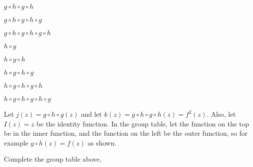 \documentclass[../gatm_answers.tex]{subfiles}
\begin{document}
\begin{inner_problem}
\item $g\circ h\circ g\circ h$
\end{inner_problem}

\begin{inner_problem}
\item $g\circ h\circ g\circ h\circ g$
\end{inner_problem}

\begin{inner_problem}
\item $g\circ h\circ g\circ h\circ g\circ h$
\end{inner_problem}

\begin{inner_problem}
\item $h\circ g$
\end{inner_problem}

\begin{inner_problem}
\item $h\circ g\circ h$
\end{inner_problem}

\begin{inner_problem}
\item $h\circ g\circ h\circ g$
\end{inner_problem}

\begin{inner_problem}
\item $h\circ g\circ h\circ g\circ h$
\end{inner_problem}

\begin{inner_problem}
\item $h\circ g\circ h\circ g\circ h\circ g$
\end{inner_problem}

\begin{outer_problem}
\item Let $j(z)=g\circ h\circ g(z)$ and let $k(z)=g\circ h\circ g\circ h(z)=f^2(z)$. Also, let $I(z)=z$ be the identity function. In the group table, let the function on the top be in the inner function, and the function on the left be the outer function, so for example $g\circ h(z)=f(z)$ as shown.
\end{outer_problem}

\begin{inner_problem}[start=1]
\item Complete the group table above,
\end{inner_problem}
\end{document}
